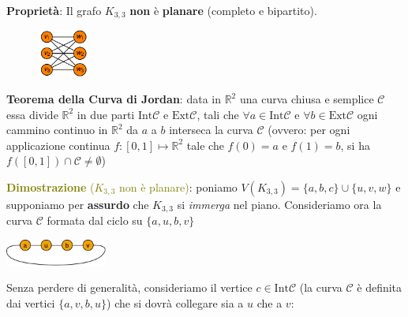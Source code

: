 \newpage
\begin{flushleft}
    \textbf{Proprietà}: Il grafo $K_{3,3}$ \textbf{non} è \textbf{planare} (completo e bipartito).
    
    \begin{figure}[h]
        \centering
        \includegraphics[width=0.15\textwidth]{img/k33}
    \end{figure}

    \textbf{Teorema della Curva di Jordan}: data in $\mathbb{R}^2$ una curva chiusa e semplice $\mathcal{C}$ essa divide $\mathbb{R}^2$ in due parti $\text{Int}\mathcal{C}$ e $\text{Ext}\mathcal{C}$, tali che $\forall a \in \text{Int}\mathcal{C}$ e $\forall b \in \text{Ext}\mathcal{C}$ ogni cammino continuo in $\mathbb{R}^2$ da $a$ a $b$ interseca la curva $\mathcal{C}$ (ovvero: per ogni applicazione continua $f: [0, 1] \mapsto \mathbb{R}^2$ tale che $f(0) = a$ e $f(1) = b$, si ha $f([0, 1]) \cap \mathcal{C} \neq \emptyset$)

    \begin{boxA}
        \textcolor{olive}{\textbf{Dimostrazione} ($K_{3,3}$ non è planare)}: poniamo $V(K_{3,3}) = \{a, b, c\} \cup \{u, v, w\}$ e supponiamo per \textbf{assurdo} che $K_{3,3}$ si \textit{immerga} nel piano. Consideriamo ora la curva $\mathcal{C}$ formata dal ciclo su $\{a, u, b, v\}$

        {\centering
            \includegraphics[width=0.25\textwidth]{img/k33_1}
        \par}
        Senza perdere di generalità, consideriamo il vertice $c \in \text{Int}\mathcal{C}$ (la curva $\mathcal{C}$ è definita dai vertici $\{a, v, b, u\}$) che si dovrà collegare sia a $u$ che a $v$:


\end{boxA}
\end{flushleft}
